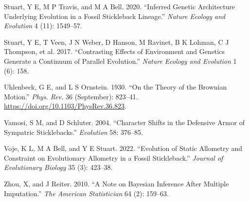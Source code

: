 \documentclass[
  12pt,
]{article}
\newlength{\cslhangindent}
\newlength{\cslentryspacingunit} %
\newenvironment{CSLReferences}[2] %
 {%
  \setlength{\parindent}{0pt}
  \ifodd #1
  \let\oldpar\par
  \def\par{\hangindent=\cslhangindent\oldpar}
  \fi
  \setlength{\parskip}{#2\cslentryspacingunit}
 }%
 {}
\begin{document}
\begin{CSLReferences}{1}{0}
\leavevmode{}%
Stuart, Y E, M P Travis, and M A Bell. 2020. {``Inferred Genetic
Architecture Underlying Evolution in a Fossil Stickleback Lineage.''}
\emph{Nature Ecology and Evolution} 4 (11): 1549--57.

\leavevmode{}%
Stuart, Y E, T Veen, J N Weber, D Hanson, M Ravinet, B K Lohman, C J
Thompson, et al. 2017. {``Contrasting Effects of Environment and
Genetics Generate a Continuum of Parallel Evolution.''} \emph{Nature
Ecology and Evolution} 1 (6): 158.

\leavevmode{}%
Uhlenbeck, G E, and L S Ornstein. 1930. {``On the Theory of the Brownian
Motion.''} \emph{Phys. Rev.} 36 (September): 823--41.
\url{https://doi.org/10.1103/PhysRev.36.823}.

\leavevmode{}%
Vamosi, S M, and D Schluter. 2004. {``Character Shifts in the Defensive
Armor of Sympatric Sticklebacks.''} \emph{Evolution} 58: 376--85.

\leavevmode{}%
Voje, K L, M A Bell, and Y E Stuart. 2022. {``Evolution of Static
Allometry and Constraint on Evolutionary Allometry in a Fossil
Stickleback.''} \emph{Journal of Evolutionary Biology} 35 (3): 423--38.

\leavevmode{}%
Zhou, X, and J Reiter. 2010. {``A Note on Bayesian Inference After
Multiple Imputation.''} \emph{The American Statistician} 64 (2):
159--63.

\end{CSLReferences}
\end{document}

